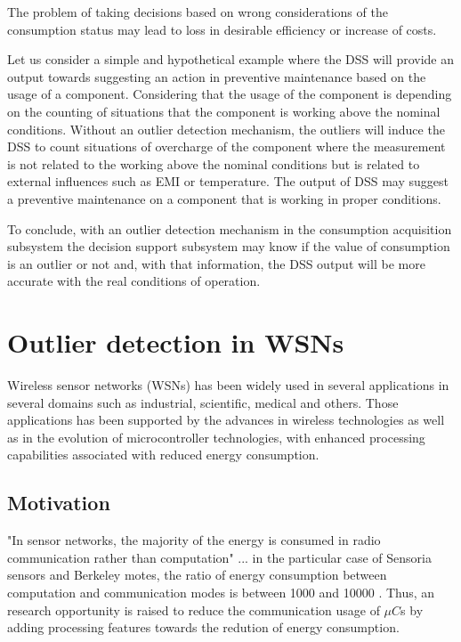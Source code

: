 The problem of taking decisions based on wrong considerations of the consumption status may lead to loss in desirable efficiency or increase of costs.

Let us consider a simple and hypothetical example where the DSS will provide an output towards suggesting an action in preventive maintenance based on the usage of a component. Considering that the usage of the component is depending on the counting of situations that the component is working above the nominal conditions. Without an outlier detection mechanism, the outliers will induce the DSS to count situations of overcharge of the component where the measurement is not related to the working above the nominal conditions but is related to external influences such as EMI or temperature. The output of DSS may suggest a preventive maintenance on a component that is working in proper conditions.

To conclude, with an outlier detection mechanism in the consumption acquisition subsystem the decision support subsystem may know if the value of consumption is an outlier or not and, with that information, the DSS output will be more accurate with the real conditions of operation.

\section{Outlier detection in WSNs}

Wireless sensor networks (WSNs) has been widely used in several applications in several domains such as industrial, scientific, medical and others. Those applications has been supported by the advances in wireless technologies as well as in the evolution of microcontroller technologies, with enhanced processing capabilities associated with reduced energy consumption.

\subsection{Motivation}

"In sensor networks, the majority of the energy is consumed in radio communication rather than computation" ... in the particular case of Sensoria sensors and Berkeley motes, the ratio of energy consumption between computation and communication modes is between 1000 and 10000 \cite{class:rajasegarar:2007}. Thus, an research opportunity is raised to reduce the communication usage of $\mu C$s by adding processing features towards the redution of energy consumption.


